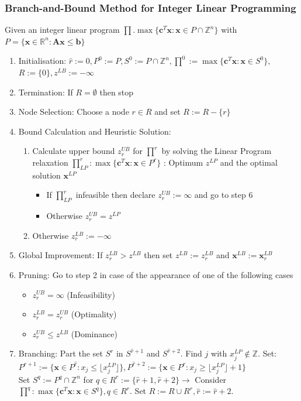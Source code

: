 \documentclass[11pt]{article}
\begin{document}
\subsubsection{Branch-and-Bound Method for Integer Linear Programming}
Given an integer linear program $\prod . \max\{\textbf{c}^T\textbf{x} : \textbf{x} \in P\cap\mathbb{Z}^n\}$ with $P = \{ \textbf{x}\in \mathbb{R}^n : \textbf{A}\textbf{x}\leq\textbf{b} \}$
\begin{enumerate}
	\item {\color{DodgerBlue1}Initialisation}: $\hat{r}:=0, P^0 := P, S^0 := P\cap\mathbb{Z}^n, \prod^0 := \max\{\textbf{c}^T\textbf{x} : \textbf{x} \in S^0\},$\\$R:=\{0\}, z^{LB} := -\infty$
	\item {\color{DodgerBlue1}Termination}: If $R = \emptyset$ then stop
	\item {\color{DodgerBlue1}Node Selection}: Choose a node $r \in R$ and set $R := R - \{r\}$
	\item {\color{DodgerBlue1}Bound Calculation and Heuristic Solution}:
	\begin{enumerate}[label=\roman*.]
		\item Calculate upper bound $z_r^{UB}$ for $\prod^r$ by solving the Linear Program relaxation $\prod_{LP}^r : \max\{\textbf{c}^T\textbf{x} : \textbf{x} \in P^r\}$ : Optimum $z^{LP}$ and the optimal solution $\textbf{x}^{LP}$
		\begin{itemize}
			\item If $\prod_{LP}^r$ infeasible then declare $z_r^{UB} := \infty$ and go to step 6
			\item Otherwise $z_r^{UB} = z^{LP}$
		\end{itemize}
		\item Otherwise $z_r^{LB} := -\infty$
	\end{enumerate}
	\item {\color{DodgerBlue1}Global Improvement}: If $z_r^{LB}>z^{LB}$ then set $z^{LB} := z_r^{LB}$ and $\textbf{x}^{LB} := \textbf{x}_r^{LB}$
	\item {\color{DodgerBlue1}Pruning}: Go to step 2 in case of the appearance of one of the following cases
	\begin{itemize}
		\item $z_r^{UB} = \infty$ (Infeasibility)
		\item $z_r^{LB} = z_r^{UB}$ (Optimality)
		\item $z_r^{UB} \leq z^{LB} $ (Dominance) 
	\end{itemize}
	\item {\color{DodgerBlue1}Branching}: Part the set $S^r$ in $S^{\hat{r}+1}$ and $S^{\hat{r}+2}$. Find $j$ with $x_j^{LP} \notin \mathbb{Z}$. Set: $P^{\hat{r}+1} := \{ \textbf{x}\in P^{\hat{r}} : x_j \leq \lfloor x_j^{LP} \rfloor \}, P^{\hat{r}+2} := \{ \textbf{x}\in P^{\hat{r}} : x_j \geq \lfloor x_j^{LP} \rfloor + 1 \}$\\
	Set $ S^q := P^q \cap \mathbb{Z}^n$ for $q\in R^r := \{ \hat{r} + 1,\hat{r} + 2\} \rightarrow $ Consider $\prod^q : \max\{\textbf{c}^T\textbf{x} : \textbf{x} \in S^q\}, q\in R^r$. Set $R := R \cup R^r, \hat{r} := \hat{r} + 2$.
\end{enumerate}
\end{document}
